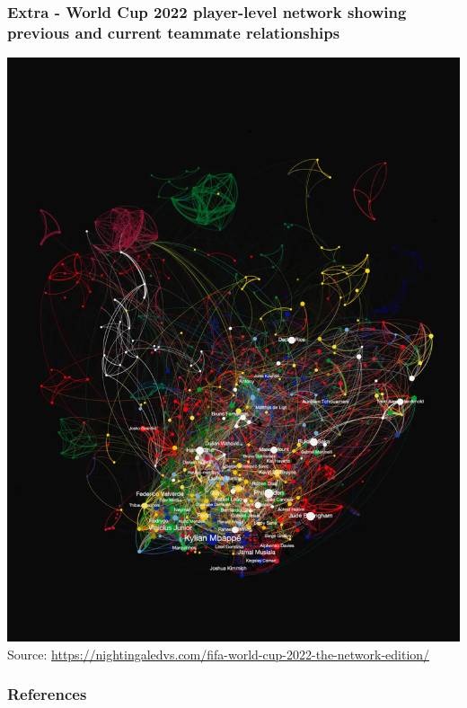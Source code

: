 \documentclass[8pt]{beamer}
\begin{document}
\begin{frame}
\frametitle{Extra - World Cup 2022 player-level network showing previous and current teammate relationships}
\centering
\includegraphics[width=\linewidth,height=0.7\textheight,keepaspectratio]{wc2022}\\
\tiny{Source: \url{https://nightingaledvs.com/fifa-world-cup-2022-the-network-edition/}}
\end{frame}

\bgroup
{}
\begin{frame}[plain]{}
\begin{center}
\color{white}{\Huge Questions}
\end{center}
\end{frame}
\egroup








\begin{frame}[allowframebreaks]
\frametitle{References}
\tiny


%
\end{frame}
\end{document}
